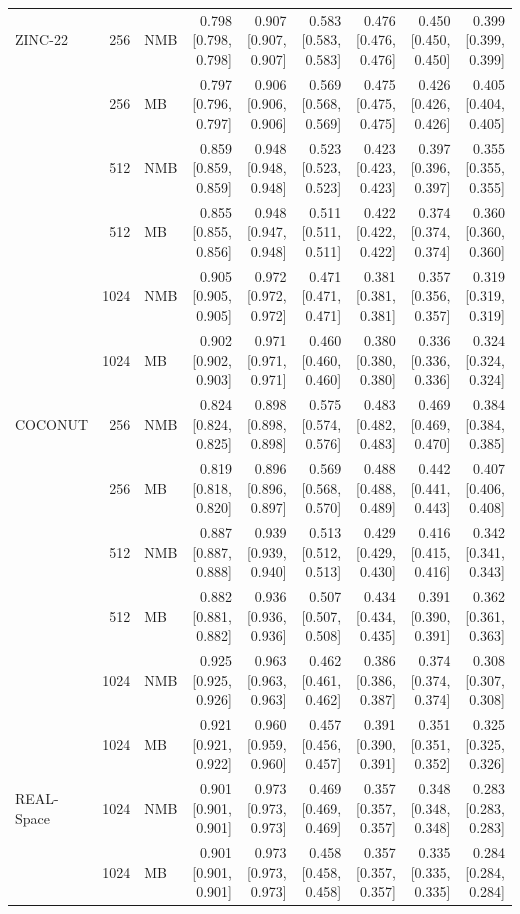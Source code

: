 \begin{table}[htbp]
{\begin{tabular}{@{}l r l r r r r r r@{}}
    \addlinespace
    ZINC-22 & 256 & NMB & 0.798 [0.798, 0.798] & 0.907 [0.907, 0.907] & 0.583 [0.583, 0.583] & 0.476 [0.476, 0.476] & 0.450 [0.450, 0.450] & 0.399 [0.399, 0.399] \\
     & 256 & MB & 0.797 [0.796, 0.797] & 0.906 [0.906, 0.906] & 0.569 [0.568, 0.569] & 0.475 [0.475, 0.475] & 0.426 [0.426, 0.426] & 0.405 [0.404, 0.405] \\
     & 512 & NMB & 0.859 [0.859, 0.859] & 0.948 [0.948, 0.948] & 0.523 [0.523, 0.523] & 0.423 [0.423, 0.423] & 0.397 [0.396, 0.397] & 0.355 [0.355, 0.355] \\
     & 512 & MB & 0.855 [0.855, 0.856] & 0.948 [0.947, 0.948] & 0.511 [0.511, 0.511] & 0.422 [0.422, 0.422] & 0.374 [0.374, 0.374] & 0.360 [0.360, 0.360] \\
     & 1024 & NMB & 0.905 [0.905, 0.905] & 0.972 [0.972, 0.972] & 0.471 [0.471, 0.471] & 0.381 [0.381, 0.381] & 0.357 [0.356, 0.357] & 0.319 [0.319, 0.319] \\
     & 1024 & MB & 0.902 [0.902, 0.903] & 0.971 [0.971, 0.971] & 0.460 [0.460, 0.460] & 0.380 [0.380, 0.380] & 0.336 [0.336, 0.336] & 0.324 [0.324, 0.324] \\
    \addlinespace
    COCONUT & 256 & NMB & 0.824 [0.824, 0.825] & 0.898 [0.898, 0.898] & 0.575 [0.574, 0.576] & 0.483 [0.482, 0.483] & 0.469 [0.469, 0.470] & 0.384 [0.384, 0.385] \\
     & 256 & MB & 0.819 [0.818, 0.820] & 0.896 [0.896, 0.897] & 0.569 [0.568, 0.570] & 0.488 [0.488, 0.489] & 0.442 [0.441, 0.443] & 0.407 [0.406, 0.408] \\
     & 512 & NMB & 0.887 [0.887, 0.888] & 0.939 [0.939, 0.940] & 0.513 [0.512, 0.513] & 0.429 [0.429, 0.430] & 0.416 [0.415, 0.416] & 0.342 [0.341, 0.343] \\
     & 512 & MB & 0.882 [0.881, 0.882] & 0.936 [0.936, 0.936] & 0.507 [0.507, 0.508] & 0.434 [0.434, 0.435] & 0.391 [0.390, 0.391] & 0.362 [0.361, 0.363] \\
     & 1024 & NMB & 0.925 [0.925, 0.926] & 0.963 [0.963, 0.963] & 0.462 [0.461, 0.462] & 0.386 [0.386, 0.387] & 0.374 [0.374, 0.374] & 0.308 [0.307, 0.308] \\
     & 1024 & MB & 0.921 [0.921, 0.922] & 0.960 [0.959, 0.960] & 0.457 [0.456, 0.457] & 0.391 [0.390, 0.391] & 0.351 [0.351, 0.352] & 0.325 [0.325, 0.326] \\
    \addlinespace
    REAL-Space & 1024 & NMB & 0.901 [0.901, 0.901] & 0.973 [0.973, 0.973] & 0.469 [0.469, 0.469] & 0.357 [0.357, 0.357] & 0.348 [0.348, 0.348] & 0.283 [0.283, 0.283] \\
     & 1024 & MB & 0.901 [0.901, 0.901] & 0.973 [0.973, 0.973] & 0.458 [0.458, 0.458] & 0.357 [0.357, 0.357] & 0.335 [0.335, 0.335] & 0.284 [0.284, 0.284] \\
    \bottomrule
  \end{tabular}%
  }
\end{table}

